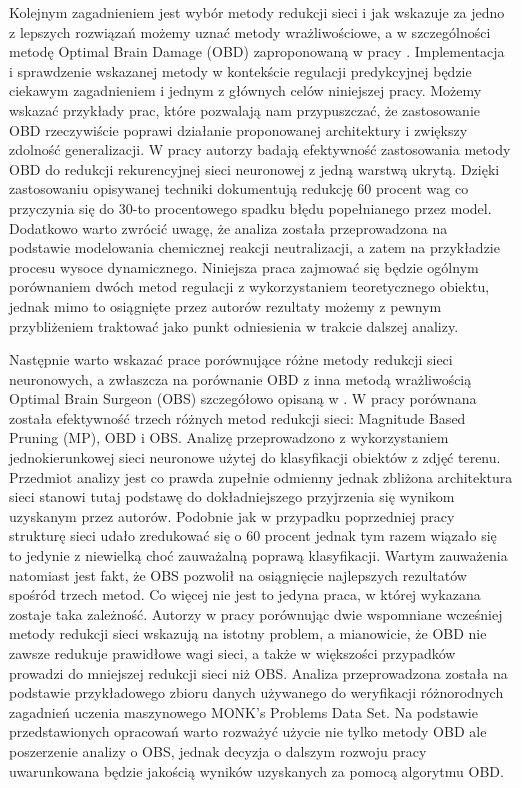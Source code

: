 \par Kolejnym zagadnieniem jest wybór metody redukcji sieci i jak wskazuje \cite{osowskiOBD} za jedno z lepszych rozwiązań możemy uznać metody wrażliwościowe, a w szczególności metodę Optimal Brain Damage (OBD) zaproponowaną w pracy \cite{lecun1989}. Implementacja i sprawdzenie wskazanej metody w kontekście regulacji predykcyjnej będzie ciekawym zagadnieniem i jednym z głównych celów niniejszej pracy. Możemy wskazać przykłady prac, które pozwalają nam przypuszczać, że zastosowanie OBD rzeczywiście poprawi działanie proponowanej architektury i zwiększy zdolność generalizacji. W pracy \cite{chaber2018} autorzy badają efektywność zastosowania metody OBD do redukcji rekurencyjnej sieci neuronowej z jedną warstwą ukrytą. Dzięki zastosowaniu opisywanej techniki dokumentują redukcję 60 procent wag co przyczynia się do 30-to procentowego spadku błędu popełnianego przez model. Dodatkowo warto zwrócić uwagę, że analiza została przeprowadzona na podstawie modelowania chemicznej reakcji neutralizacji, a zatem na przykładzie procesu wysoce dynamicznego. Niniejsza praca zajmować się będzie ogólnym porównaniem dwóch metod regulacji z wykorzystaniem teoretycznego obiektu, jednak mimo to osiągnięte przez autorów rezultaty możemy z pewnym przybliżeniem traktować jako punkt odniesienia w trakcie dalszej analizy.

\par Następnie warto wskazać prace porównujące różne metody redukcji sieci neuronowych, a zwłaszcza na porównanie OBD z inna metodą wrażliwością Optimal Brain Surgeon (OBS) szczegółowo opisaną w \cite{osowskiOBD}. W pracy \cite{kavzoglu1998} porównana została efektywność trzech różnych metod redukcji sieci: Magnitude Based Pruning (MP), OBD i OBS. Analizę przeprowadzono z wykorzystaniem jednokierunkowej sieci neuronowe użytej do klasyfikacji obiektów z zdjęć terenu. Przedmiot analizy jest co prawda zupełnie odmienny jednak zbliżona architektura sieci stanowi tutaj podstawę do dokładniejszego przyjrzenia się wynikom uzyskanym przez autorów. Podobnie jak w przypadku poprzedniej pracy strukturę sieci udało zredukować się o 60 procent jednak tym razem wiązało się to jedynie z niewielką choć zauważalną poprawą klasyfikacji. Wartym zauważenia natomiast jest fakt, że OBS pozwolił na osiągnięcie najlepszych rezultatów spośród trzech metod. Co więcej nie jest to jedyna praca, w której wykazana zostaje taka zależność. Autorzy w pracy \cite{hassibi1993} porównując dwie wspomniane wcześniej metody redukcji sieci wskazują na istotny problem, a mianowicie, że OBD nie zawsze redukuje prawidłowe wagi sieci, a także w większości przypadków prowadzi do mniejszej redukcji sieci niż OBS. Analiza przeprowadzona została na podstawie przykładowego zbioru danych używanego do weryfikacji różnorodnych zagadnień uczenia maszynowego MONK's Problems Data Set. Na podstawie przedstawionych opracowań warto
rozważyć użycie nie tylko metody OBD ale poszerzenie analizy o OBS, jednak decyzja o dalszym rozwoju pracy uwarunkowana będzie jakością wyników uzyskanych za pomocą algorytmu OBD.

